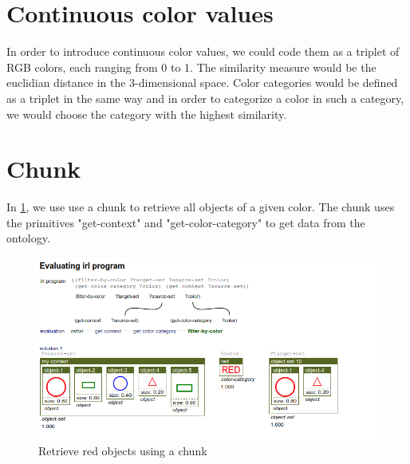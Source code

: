 \documentclass[a4paper,10pt]{article}
\begin{document}
\section{Continuous color values}

In order to introduce continuous color values, we could code them as a triplet of RGB colors, each ranging from 0 to 1. The similarity measure would be the euclidian distance in the 3-dimensional space. Color categories would be defined as a triplet in the same way and in order to categorize a color in such a category, we would choose the category with the highest similarity.

\section{Chunk}

In \ref{fig:filter-color-chunk}, we use use a chunk to retrieve all objects of a given color. The chunk uses the primitives "get-context" and "get-color-category" to get data from the ontology.

\begin{figure}[!h]
    \centering
    \includegraphics[width=1.0\textwidth]{filter-color-chunk.png}
    \caption{Retrieve red objects using a chunk}
    \label{fig:filter-color-chunk}
\end{figure}
\end{document}

